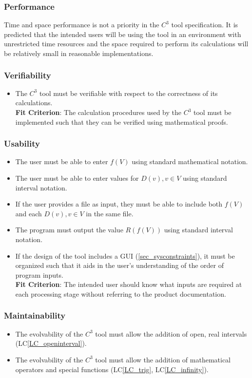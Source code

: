 \documentclass[12pt]{article}
\newcommand{\lcref}[1]{LC\ref{#1}}
\newcommand{\prognameAbbrv}{$C^{3}$}
\begin{document}
\subsubsection*{Performance}
Time and space performance is not a priority in the \prognameAbbrv{} tool 
specification. It is predicted that the intended users will be using the tool 
in an environment with unrestricted time resources and the space required to 
perform its calculations will be relatively small in reasonable implementations.

\subsubsection*{Verifiability}
\begin{itemize}
	\item The \prognameAbbrv{} tool must be verifiable with respect to the 
	correctness of its calculations.\\ \textbf{Fit Criterion}: The calculation 
	procedures used by the \prognameAbbrv{} tool must be implemented such that 
	they can be verified using mathematical proofs.
\end{itemize}

\subsubsection*{Usability}
\begin{itemize}
	\item The user must be able to enter $f(V)$ using standard mathematical 
	notation.
	\item The user must be able to enter values for $D(v), v \in V$ using 
	standard 
	interval notation.
	\item If the user provides a file as input, they must be able to include 
	both $f(V)$ and each $D(v), v \in V$ in the same file.
	\item The program must output the value $R(f(V))$ using standard interval 
	notation.
	\item If the design of the tool includes a GUI (\ref{sec_sysconstraints}), 
	it must be organized such that it aids in the user's understanding of the 
	order of program inputs.\\\textbf{Fit Criterion}: The intended user should 
	know what inputs are required at each processing stage without referring to 
	the product documentation.
\end{itemize}

\subsubsection*{Maintainability}
\begin{itemize}
	\item The evolvability of the \prognameAbbrv{} tool must allow the addition 
	of open, real intervals (\lcref{LC_openinterval}).
	\item The evolvability of the \prognameAbbrv{} tool must allow the addition 
	of mathematical operators and special functions (\lcref{LC_trig}, 
	\lcref{LC_infinity}).
\end{itemize}
\end{document}
